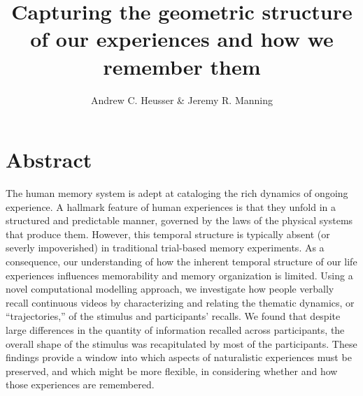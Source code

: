 \documentclass{article}
\title{Capturing the geometric structure of our experiences and how we remember them}
\author{Andrew C. Heusser \& Jeremy R. Manning}
\begin{document}
\maketitle

\section{Abstract}
{
The human memory system is adept at cataloging the rich dynamics of ongoing experience. A hallmark feature of human experiences is that they unfold in a structured and predictable manner, governed by the laws of the physical systems that produce them. However, this temporal structure is typically absent (or severly impoverished) in traditional trial-based memory experiments. As a consequence, our understanding of how the inherent temporal structure of our life experiences influences memorability and memory organization is limited. Using a novel computational modelling approach, we investigate how people verbally recall continuous videos by characterizing and relating the thematic dynamics, or ``trajectories,'' of the stimulus and participants' recalls. We found that despite large differences in the quantity of information recalled across participants, the overall shape of the stimulus was recapitulated by most of the participants. These findings provide a window into which aspects of naturalistic experiences must be preserved, and which might be more flexible, in considering whether and how those experiences are remembered.


}
\end{document}
